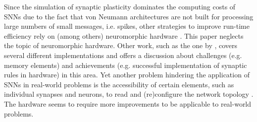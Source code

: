 Since the simulation of synaptic plasticity dominates the computing costs of \acp{SNN} due to the fact that von Neumann architectures are not built 
for processing large numbers of small messages, i.e. spikes, 
other strategies to improve run-time efficiency rely on (among others) neuromorphic hardware \cite{simulation_STDP}.
This paper neglects the topic of neuromorphic hardware.
Other work, such as the one by \authorsSynapticPlasticity{} \cite{Synaptic_plasticity}, 
covers several different implementations and offers a discussion about challenges (e.g. memory elements) and achievements 
(e.g. successful implementation of synaptic rules in hardware) in this area.
Yet another problem hindering the application of \acp{SNN} in real-world problems is the accessibility of certain elements, such as individual synapses and neurons, 
to read and (re)configure the network topology \cite{hardware_STDP}.
The hardware seems to require more improvements to be applicable to real-world problems.